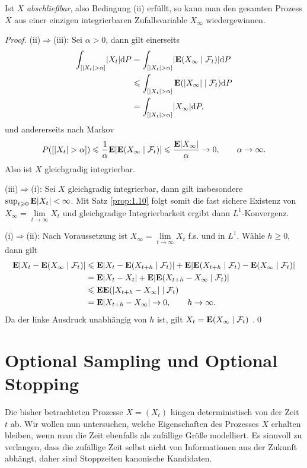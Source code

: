 Ist $X$ \emph{abschließbar}, also Bedingung (ii) erfüllt, so kann man den
gesamten Prozess $X$ aus einer einzigen integrierbaren Zufallsvariable $X_\infty$
wiedergewinnen.

\begin{proof}
(ii)$\Rightarrow$(iii): 
Sei $\alpha > 0$, dann gilt einerseits
\begin{align*}
\int_{[\lvert X_t\rvert > \alpha]} \lvert X_t\rvert\mathrm{d} P
&= 
\int_{[\lvert X_t\rvert > \alpha]} \lvert\mathbf{E}(X_\infty\mid \mathcal{F}_t)\rvert\mathrm{d} P\\
&\leqslant
\int_{[\lvert X_t\rvert > \alpha]} \mathbf{E}(\lvert X_\infty\rvert\mid \mathcal{F}_t)\mathrm{d} P\\
&=
\int_{[\lvert X_t\rvert > \alpha]} \lvert X_\infty\rvert\mathrm{d} P,
\end{align*}
und andererseits nach Markov
\begin{align*}
P([\lvert X_t\rvert > \alpha]) \leqslant \frac{1}{\alpha}\mathbf{E}\lvert\mathbf{E}(X_\infty\mid\mathcal{F}_t)\rvert \leqslant
\frac{\mathbf{E}\lvert X_\infty\rvert}{\alpha} \to 0,\qquad \alpha \to \infty.
\end{align*}
Also ist $X$ gleichgradig integrierbar.

(iii)$\Rightarrow$(i): Sei $X$ gleichgradig integrierbar, dann gilt
insbesondere $\sup_{t\geqslant 0} \mathbf{E} \lvert X_t\rvert < \infty$. Mit Satz
\ref{prop:1.10} folgt somit die fast sichere Existenz von $X_\infty
=\lim\limits_{t\to\infty} X_t$ und gleichgradige
Integrierbarkeit ergibt dann $L^1$-Konvergenz.

(i)$\Rightarrow$(ii): Nach Voraussetzung ist $X_\infty =
\lim\limits_{t\to\infty} X_t$ f.s. und in $L^1$. Wähle $h\ge 0$, dann gilt
\begin{align*}
\mathbf{E}\lvert X_t-\mathbf{E}(X_\infty\mid \mathcal{F}_t)\rvert
&\leqslant
\mathbf{E}\lvert X_t - \mathbf{E}(X_{t+h}\mid\mathcal{F}_t)\rvert + \mathbf{E}\lvert\mathbf{E}(X_{t+h}\mid\mathcal{F}_t)-\mathbf{E}(X_\infty\mid
\mathcal{F}_t)\rvert\\
&= \mathbf{E}\lvert X_t - X_t\rvert + \mathbf{E}\lvert\mathbf{E}(X_{t+h}-X_\infty\mid\mathcal{F}_t)\rvert\\
&\leqslant \mathbf{E} \mathbf{E}(\lvert X_{t+h}-X_\infty\rvert\mid \mathcal{F}_t)\\
&= \mathbf{E} \lvert X_{t+h}-X_\infty\rvert\to 0,\qquad h\to \infty.
\end{align*}
Da der linke Ausdruck unabhängig von $h$ ist, gilt $X_t = \mathbf{E}(X_\infty\mid
\mathcal{F}_t)$ \fs.\qed
\end{proof}


\section{Optional Sampling und Optional Stopping}

Die bisher betrachteten Prozesse $X=(X_t)$ hingen deterministisch von der Zeit
$t$ ab. Wir wollen nun untersuchen, welche Eigenschaften des Prozesses $X$
erhalten bleiben, wenn man die Zeit ebenfalls als zufällige Größe modelliert.
Es sinnvoll zu verlangen, dass die zufällige Zeit selbst nicht von Informationen
aus der Zukunft abhängt, daher sind Stoppzeiten kanonische Kandidaten.

